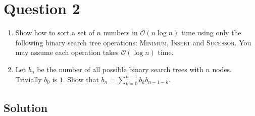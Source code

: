 
\section*{Question 2}

\begin{enumerate}[label=(\alph*)]
\item Show how to sort a set of $n$ numbers in $\mathcal{O}(n\log n)$ time using only the following binary search tree operations: \textsc{Minimum}, \textsc{Insert} and \textsc{Sucessor}.
You may assume each operation takes $\mathcal{O}(\log n)$ time.

\item Let $b_n$ be the number of all possible binary search trees with $n$ nodes.
Trivially $b_0$ is $1$.
Show that $b_n = \sum_{k=0}^{n-1} b_k b_{n-1-k}$.
\end{enumerate}

\subsection*{Solution}

